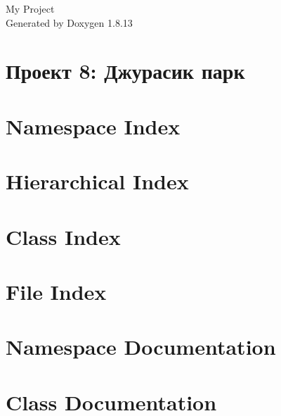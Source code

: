 \documentclass[twoside]{book}
\newcommand{\+}{\discretionary{\mbox{\scriptsize$\hookleftarrow$}}{}{}}
\newcommand{\clearemptydoublepage}{%
  \newpage{\pagestyle{empty}\cleardoublepage}%
}
\begin{document}
\hypersetup{pageanchor=false,
             bookmarksnumbered=true,
             pdfencoding=unicode
            }
\begin{titlepage}
\vspace*{7cm}
\begin{center}%
{\Large My Project }\\
\vspace*{1cm}
{\large Generated by Doxygen 1.8.13}\\
\end{center}
\end{titlepage}
\clearemptydoublepage
{}
\tableofcontents
\clearemptydoublepage
{}
\hypersetup{pageanchor=true}

\chapter{Проект 8\+: Джурасик парк}
\label{index}\hypertarget{index}{}
\chapter{Namespace Index}

\chapter{Hierarchical Index}

\chapter{Class Index}

\chapter{File Index}

\chapter{Namespace Documentation}

\chapter{Class Documentation}























\end{document}
